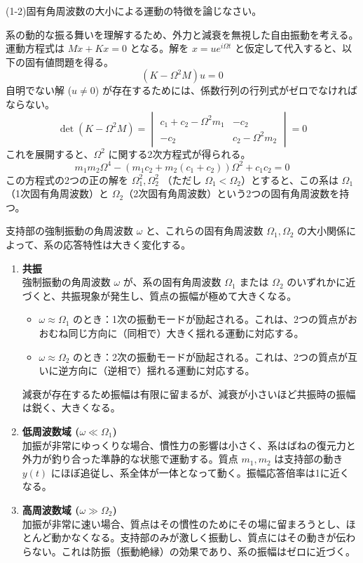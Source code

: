 \documentclass[dvipdfmx,a4paper]{jsarticle}
\begin{document}
(1-2)固有角周波数の大小による運動の特徴を論じなさい。

系の動的な振る舞いを理解するため、外力と減衰を無視した自由振動を考える。運動方程式は $M\ddot{x} + Kx = 0$ となる。解を $x = u e^{i\Omega t}$ と仮定して代入すると、以下の固有値問題を得る。
$$ (K - \Omega^2 M) u = 0 $$
自明でない解 ($u \neq 0$) が存在するためには、係数行列の行列式がゼロでなければならない。
$$ \det(K - \Omega^2 M) = \begin{vmatrix} c_1+c_2 - \Omega^2 m_1 & -c_2 \\ -c_2 & c_2 - \Omega^2 m_2 \end{vmatrix} = 0 $$
これを展開すると、$\Omega^2$ に関する2次方程式が得られる。
$$ m_1 m_2 \Omega^4 - (m_1 c_2 + m_2(c_1+c_2)) \Omega^2 + c_1 c_2 = 0 $$
この方程式の2つの正の解を $\Omega_1^2, \Omega_2^2$ （ただし $\Omega_1 < \Omega_2$）とすると、この系は $\Omega_1$（1次固有角周波数）と $\Omega_2$（2次固有角周波数）という2つの固有角周波数を持つ。

支持部の強制振動の角周波数 $\omega$ と、これらの固有角周波数 $\Omega_1, \Omega_2$ の大小関係によって、系の応答特性は大きく変化する。

\begin{enumerate}
    \item \textbf{共振} \\
    強制振動の角周波数 $\omega$ が、系の固有角周波数 $\Omega_1$ または $\Omega_2$ のいずれかに近づくと、共振現象が発生し、質点の振幅が極めて大きくなる。
    \begin{itemize}
        \item $\omega \approx \Omega_1$ のとき：1次の振動モードが励起される。これは、2つの質点がおおむね同じ方向に（同相で）大きく揺れる運動に対応する。
        \item $\omega \approx \Omega_2$ のとき：2次の振動モードが励起される。これは、2つの質点が互いに逆方向に（逆相で）揺れる運動に対応する。
    \end{itemize}
    減衰が存在するため振幅は有限に留まるが、減衰が小さいほど共振時の振幅は鋭く、大きくなる。

    \item \textbf{低周波数域 ($\omega \ll \Omega_1$)} \\
    加振が非常にゆっくりな場合、慣性力の影響は小さく、系はばねの復元力と外力が釣り合った準静的な状態で運動する。質点 $m_1, m_2$ は支持部の動き $y(t)$ にほぼ追従し、系全体が一体となって動く。振幅応答倍率は1に近くなる。

    \item \textbf{高周波数域 ($\omega \gg \Omega_2$)} \\
    加振が非常に速い場合、質点はその慣性のためにその場に留まろうとし、ほとんど動かなくなる。支持部のみが激しく振動し、質点にはその動きが伝わらない。これは防振（振動絶縁）の効果であり、系の振幅はゼロに近づく。
\end{enumerate}
\end{document}
